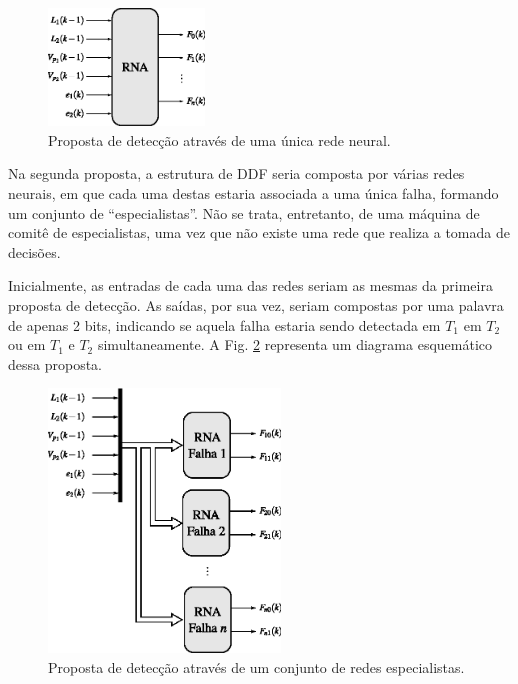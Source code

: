 \begin{figure}[!htb]
\centering
    \includegraphics[width=0.37\textwidth]{imgs/sistema/eps/detec_prop_1}
    \caption{Proposta de detecção através de uma única rede neural.}
    \label{fig:detec_prop_1}
\end{figure}

Na segunda proposta, a estrutura de DDF seria composta por várias redes neurais,
em que cada uma destas estaria associada a uma única falha, formando um conjunto
de ``especialistas''. Não se trata, entretanto, de uma máquina de comitê de
especialistas, uma vez que não existe uma rede que realiza a tomada de decisões. 

Inicialmente, as entradas de cada uma das redes seriam as mesmas da primeira
proposta de detecção. As saídas, por sua vez, seriam compostas por uma palavra
de apenas 2 bits, indicando se aquela falha estaria sendo detectada em $T_1$ em
$T_2$ ou em $T_1$ e $T_2$ simultaneamente. A Fig. \ref{fig:detec_prop_2}
representa um diagrama esquemático dessa proposta.

\begin{figure}[!htb]
\centering
    \includegraphics[width=0.55\textwidth]{imgs/sistema/eps/detec_prop_2}
    \caption{Proposta de detecção através de um conjunto de redes
             especialistas.}
    \label{fig:detec_prop_2}
\end{figure}

